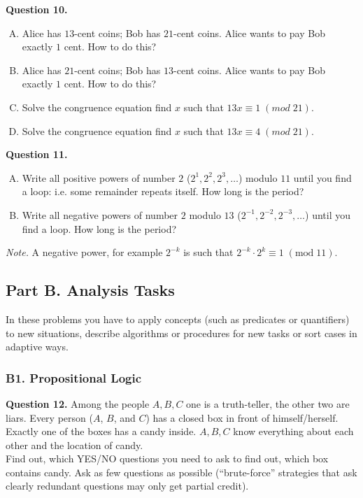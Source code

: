 \documentclass[jou]{apa6}
\begin{document}
\vspace{6pt}
{\bf Question 10.} 
\begin{enumerate}[(A)]
\item Alice has $13$-cent coins; Bob has $21$-cent coins. 
Alice wants to pay Bob exactly $1$ cent. How to do this?
\item Alice has $21$-cent coins; Bob has $13$-cent coins. 
Alice wants to pay Bob exactly $1$ cent. How to do this?
\item Solve the congruence equation \textendash{} find
$x$ such that $13x \equiv 1\;(mod\;21)$. 
\item Solve the congruence equation \textendash{} find
$x$ such that $13x \equiv 4\;(mod\;21)$. 
\end{enumerate}


\vspace{6pt}
{\bf Question 11.} 
\begin{enumerate}[(A)]
\item Write all positive powers of number $2$ ($2^1, 2^2, 2^3,\ldots$) modulo $11$ until 
you find a loop: i.e. some remainder repeats itself. How long is the period?
\item Write all negative powers of number $2$ modulo $13$ ($2^{-1},2^{-2},2^{-3},\ldots$) until 
you find a loop. How long is the period?
\end{enumerate}

{\em Note.} A negative power, for example $2^{-k}$ is such that $2^{-k}\cdot 2^k \equiv 1\;(\text{mod}\;11)$. 





\subsection{Part B. Analysis Tasks}

In these problems you have to apply concepts 
(such as predicates or quantifiers) to new situations, 
describe algorithms or procedures for new tasks
or sort cases in adaptive ways.


\subsubsection{B1. Propositional Logic}

{\bf Question 12.}
Among the people $A,B,C$ one is a truth-teller, 
the other two are liars. 
Every person ($A$, $B$, and $C$) has a closed box
in front of himself/herself. Exactly one of the 
boxes has a candy inside. $A,B,C$ know everything 
about each other and the location of candy.\\
Find out, which YES/NO questions you 
need to ask to find out, which box contains candy. 
Ask as few questions as possible 
(``brute-force'' strategies that ask clearly redundant
questions may only get partial credit). 
\end{document}
